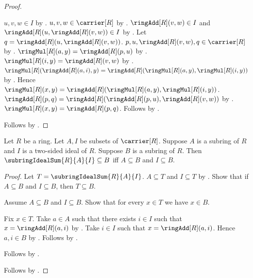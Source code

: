 \begin{proof}
\begin{subproof}
        $u,v,w\in I$ by
            .
        $u,v,w\in\carrier[R]$ by
            .
        $\ringAdd[R](v,w)\in I$ and
            $\ringAdd[R](u,\ringAdd[R](v,w))\in I$ by
            .
        Let $q=\ringAdd[R](u,\ringAdd[R](v,w))$.
        $p,u,\ringAdd[R](v,w),q\in\carrier[R]$ by
            .
        $\ringMul[R](a,y)=\ringAdd[R](p,u)$ by
            .
        $\ringMul[R](i,y)=\ringAdd[R](v,w)$ by
            .
        $\ringMul[R](\ringAdd[R](a,i),y)
            =\ringAdd[R](\ringMul[R](a,y),\ringMul[R](i,y))$ by
            .
        Hence $\ringMul[R](x,y)
            =\ringAdd[R](\ringMul[R](a,y),\ringMul[R](i,y))$.
        $\ringAdd[R](p,q)
            =\ringAdd[R](\ringAdd[R](p,u),\ringAdd[R](v,w))$ by
            .
        $\ringMul[R](x,y)
            =\ringAdd[R](p,q)$.
        Follows by .
    \end{subproof}
    Follows by .
\end{proof}

\begin{theorem}\label{subring_ideal_sum_universal_property}
    Let $R$ be a ring.
    Let $A,I$ be subsets of $\carrier[R]$.
    Suppose $A$ is a subring of $R$ and $I$ is a two-sided ideal of $R$.
    Suppose $B$ is a subring of $R$.
    Then $\subringIdealSum{R}{A}{I}\subseteq B$ iff
        $A\subseteq B$ and $I\subseteq B$.
\end{theorem}
\begin{proof}
    Let $T=\subringIdealSum{R}{A}{I}$.
    $A\subseteq T$ and $I\subseteq T$ by
        .
    Show that if $A\subseteq B$ and $I\subseteq B$, then $T\subseteq B$.
    \begin{subproof}
        Assume $A\subseteq B$ and $I\subseteq B$.
        Show that for every $x\in T$ we have $x\in B$.
        \begin{subproof}
            Fix $x\in T$.
            Take $a\in A$ such that there exists $i\in I$ such that
                $x=\ringAdd[R](a,i)$ by .
            Take $i\in I$ such that $x=\ringAdd[R](a,i)$.
            Hence $a,i\in B$ by .
            Follows by
                .
        \end{subproof}
        Follows by .
    \end{subproof}
    Follows by .
\end{proof}

